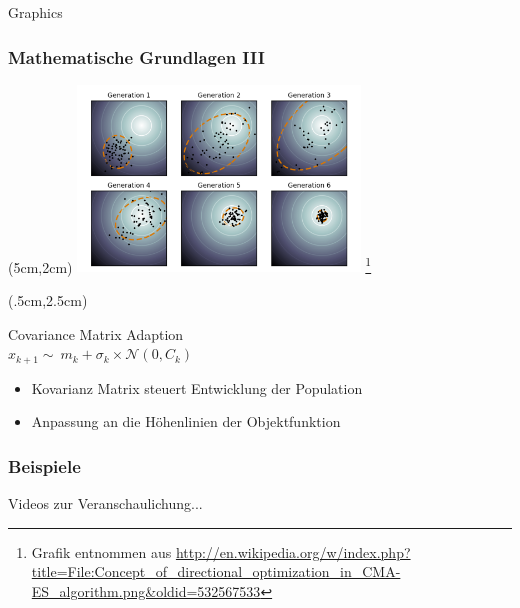 \begin{frame}{Graphics} 
  	\frametitle{Mathematische Grundlagen III}
%  	
  	\begin{textblock*}{7.5cm}(5cm,2cm) %
  		\includegraphics[width=7.5cm]{../img/Concept_of_directional_optimization_in_CMA-ES_algorithm.png}
  		\footnote{Grafik entnommen aus \url{http://en.wikipedia.org/w/index.php?title=File:Concept_of_directional_optimization_in_CMA-ES_algorithm.png&oldid=532567533}}
  	\end{textblock*}
%  	
	\begin{textblock*}{4cm}(.5cm,2.5cm) %
		\small
		\begin{cmaes} 
			Covariance Matrix Adaption\\
			$x_{k+1} \sim\ m_k + \sigma_k\times\mathcal{N}(0,C_k)$
		\end{cmaes}
		\small		
  		\begin{itemize}
  	
  		\item Kovarianz Matrix steuert Entwicklung der Population
  		\item Anpassung an die Höhenlinien der Objektfunktion
%  		
  		\end{itemize}
  	\end{textblock*}
%  	
\end{frame}
\begin{frame} %
  \frametitle{Beispiele}
%  
 	\begin{vids}
		Videos zur Veranschaulichung...
 	\end{vids}
%  
\end{frame}

